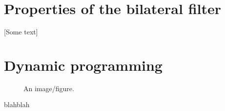 \documentclass[]{article}
\begin{document}
\section{Properties of the bilateral filter}

[Some text]

\section{Dynamic programming}



\begin{figure}[h]
	\caption{An image/figure.}
	\centering
\end{figure}


blahblah
\end{document}
